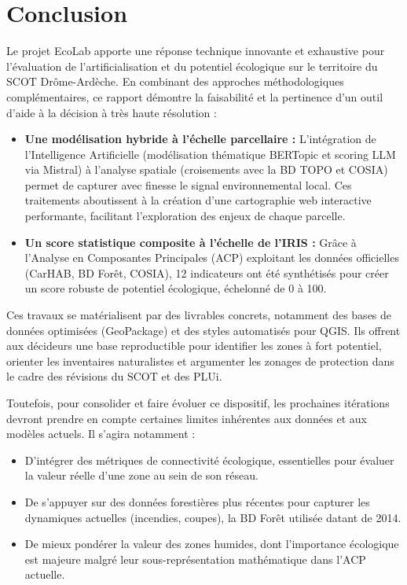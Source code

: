 \documentclass[11pt,a4paper]{report}
\begin{document}
\chapter*{Conclusion}

Le projet EcoLab apporte une réponse technique innovante et exhaustive pour l'évaluation de l'artificialisation et du potentiel écologique sur le territoire du SCOT Drôme-Ardèche. En combinant des approches méthodologiques complémentaires, ce rapport démontre la faisabilité et la pertinence d'un outil d'aide à la décision à très haute résolution :

\begin{itemize}
    \item \textbf{Une modélisation hybride à l'échelle parcellaire :} L'intégration de l'Intelligence Artificielle (modélisation thématique BERTopic et scoring LLM via Mistral) à l'analyse spatiale (croisements avec la BD TOPO et COSIA) permet de capturer avec finesse le signal environnemental local. Ces traitements aboutissent à la création d'une cartographie web interactive performante, facilitant l'exploration des enjeux de chaque parcelle.
    \item \textbf{Un score statistique composite à l'échelle de l'IRIS :} Grâce à l'Analyse en Composantes Principales (ACP) exploitant les données officielles (CarHAB, BD Forêt, COSIA), 12 indicateurs ont été synthétisés pour créer un score robuste de potentiel écologique, échelonné de 0 à 100.
\end{itemize}

Ces travaux se matérialisent par des livrables concrets, notamment des bases de données optimisées (GeoPackage) et des styles automatisés pour QGIS. Ils offrent aux décideurs une base reproductible pour identifier les zones à fort potentiel, orienter les inventaires naturalistes et argumenter les zonages de protection dans le cadre des révisions du SCOT et des PLUi.

Toutefois, pour consolider et faire évoluer ce dispositif, les prochaines itérations devront prendre en compte certaines limites inhérentes aux données et aux modèles actuels. Il s'agira notamment :

\begin{itemize}
    \item D'intégrer des métriques de connectivité écologique, essentielles pour évaluer la valeur réelle d'une zone au sein de son réseau.
    \item De s'appuyer sur des données forestières plus récentes pour capturer les dynamiques actuelles (incendies, coupes), la BD Forêt utilisée datant de 2014.
    \item De mieux pondérer la valeur des zones humides, dont l'importance écologique est majeure malgré leur sous-représentation mathématique dans l'ACP actuelle.
\end{itemize}
\end{document}
